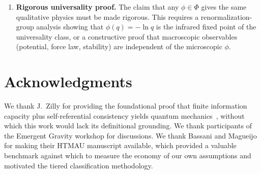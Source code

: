 \documentclass[aps,prd,twocolumn,showpacs,superscriptaddress,preprintnumbers]{revtex4-2}
\begin{document}
\begin{enumerate}
    \item \textbf{Rigorous universality proof.} The claim that any $\phi\in\Phi$ gives the same qualitative physics must be made rigorous. This requires a renormalization-group analysis showing that $\phi(q)=-\ln q$ is the infrared fixed point of the universality class, or a constructive proof that macroscopic observables (potential, force law, stability) are independent of the microscopic $\phi$.
\end{enumerate}

\section*{Acknowledgments}

We thank J.~Zilly for providing the foundational proof that finite information capacity plus self-referential consistency yields quantum mechanics~\cite{Zilly:2026}, without which this work would lack its definitional grounding.
We thank participants of the Emergent Gravity workshop for discussions.
We thank Bassani and Magueijo for making their HTMAU manuscript available, which provided a valuable benchmark against which to measure the economy of our own assumptions and motivated the tiered classification methodology.
\end{document}
